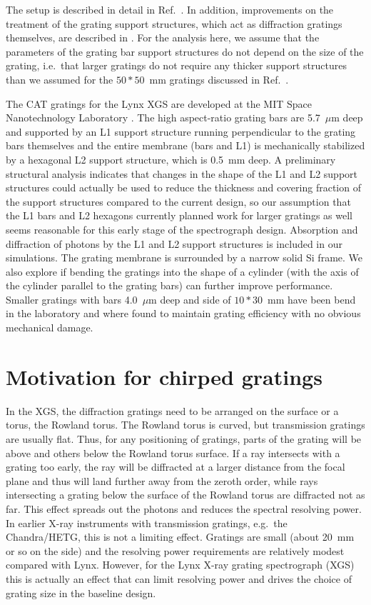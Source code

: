 \documentclass[]{spie}  %
\begin{document}
The setup is described in detail in Ref.~. In addition, improvements on the treatment of the grating support structures, which act as diffraction gratings themselves, are described in \cite{10.1117/12.2525814}. For the analysis here, we assume that the parameters of the grating bar support structures do not depend on the size of the grating, i.e.\ that larger gratings do not require any thicker support structures than we assumed for the $50*50$~mm gratings discussed in Ref.~.

The CAT gratings for the Lynx XGS are developed at the
MIT Space Nanotechnology Laboratory
\cite{Heilmann:11,doi:10.1117/12.2188525,10.1117/12.2314180,10.1117/12.2529354}. The high aspect-ratio grating bars are
5.7~$\mu$m deep and supported by an L1 support structure running
perpendicular to the grating bars themselves and the entire membrane
(bars and L1) is mechanically stabilized by a hexagonal L2 support
structure, which is 0.5~mm deep. 
A preliminary structural analysis indicates that changes in the shape of the L1 and L2 support structures could actually be used to reduce the thickness and covering fraction of the support structures compared to the current design, so our assumption that the L1 bars and L2 hexagons currently planned work for larger gratings as well seems reasonable for this early stage of the spectrograph design.
Absorption and diffraction of photons
by the L1 and L2 support structures is included in our
simulations. The grating membrane is surrounded by a narrow solid Si frame. We also explore if bending the gratings into the shape of a cylinder (with the axis of the cylinder parallel to the grating bars) can further improve performance. Smaller gratings with bars 4.0~$\mu$m deep and side of $10 * 30$~mm have been bend in the laboratory and where found to maintain grating efficiency with no obvious mechanical damage\cite{10.1117/12.2274205}.

\section{Motivation for chirped gratings}
\label{sect:motivation}
In the XGS, the diffraction gratings need to be arranged on the surface or a torus, the Rowland torus\cite{beuermann:78}. The Rowland torus is curved, but transmission gratings are usually flat. Thus, for any positioning of gratings, parts of the grating will be above and others below the Rowland torus surface. If a ray intersects with a grating too early, the ray will be diffracted at a larger distance from the focal plane and thus will land further away from the zeroth order, while rays intersecting a grating below the surface of the Rowland torus are diffracted not as far. This effect spreads out the photons and reduces the spectral resolving power. In earlier X-ray instruments with transmission gratings, e.g.\ the Chandra/HETG, this is not a limiting effect. Gratings are small (about 20~mm or so on the side) and the resolving power requirements are relatively modest compared with Lynx. However, for the Lynx X-ray grating spectrograph (XGS) this is actually an effect that can limit resolving power and drives the choice of grating size in the baseline design.
\end{document}
